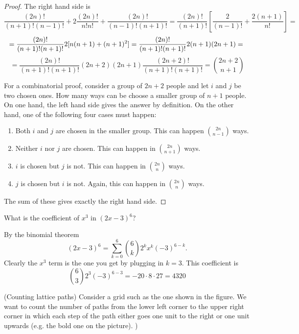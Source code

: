 \documentclass[11pt]{preprint}
\def\enumb{\begin{enumerate}}
\def\enume{\end{enumerate}}
\begin{document}
\begin{proof}
The right hand side is
\[
\frac{(2n)!}{(n+1)!(n-1)!}+2\frac{(2n)!}{n!n!}+\frac{(2n)!}{(n-1)!(n+1)!}=\frac{(2n)!}{(n+1)!}\left[\frac{2}{(n-1)!}+\frac{2(n+1)}{n!}\right]=
\]
\[
=\frac{(2n)!}{(n+1)!(n+1)!}2[n(n+1)+(n+1)^2]=\frac{(2n)!}{(n+1)!(n+1)!}2(n+1)(2n+1)=\\
\]
\[
=\frac{(2n)!}{(n+1)!(n+1)!}(2n+2)(2n+1)\frac{(2n+2)!}{(n+1)!(n+1)!}=\binom{2n+2}{n+1}
\]

For a combinatorial proof, consider a group of $2n+2$ people and let $i$ and $j$ be two chosen ones. How many ways can be choose a smaller group of $n+1$ people. On one hand, the left hand side gives the answer by definition. On the other hand, one of the following four cases must happen:
\enumb
\item Both $i$ and $j$ are chosen in the smaller group. This can happen $\binom{2n}{n-1}$ ways.
\item Neither $i$ nor $j$ are chosen. This can happen in $\binom{2n}{n+1}$ ways.
\item $i$ is chosen but $j$ is not. This can happen in $\binom{2n}{n}$ ways.
\item $j$ is chosen but $i$ is not. Again, this can happen in $\binom{2n}{n}$ ways.
\enume
The sum of these gives exactly the right hand side.
\end{proof}


\item What is the coefficient of $x^3$ in $(2x-3)^6$?

\vspace{0.1cm}
By the binomial theorem
\[
(2x-3)^6=\sum_{k=0}^6\binom{6}{k}2^kx^k(-3)^{6-k}.
\]
Clearly the $x^3$ term is the one you get by plugging in $k=3$. This coefficient is
\[
\binom{6}{3}2^3(-3)^{6-3}=-20\cdot 8\cdot 27 = 4320
\]
\vspace{0.05cm}
\newpage
\item (Counting lattice paths) Consider a grid such as the one shown in the figure. We want to count the number of paths from the lower left corner to the upper right corner in which each step of the path either goes one unit to the right or one unit upwards (e.g. the bold one on the picture).
)
\begin{figure}[h]
\centering
{}
\end{figure}
\end{document}

